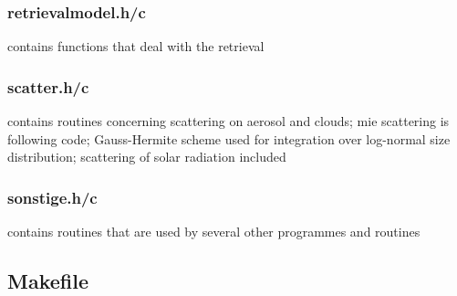 \subsubsection{retrievalmodel.h/c}
contains functions that deal with the retrieval

\subsubsection{scatter.h/c}
contains routines concerning scattering on aerosol and clouds; mie scattering is following \citet{Bohren1983} code; Gauss-Hermite scheme used for integration over log-normal size distribution; scattering of solar radiation included

\subsubsection{sonstige.h/c}
contains routines that are used by several other programmes and routines

\subsection{Makefile}